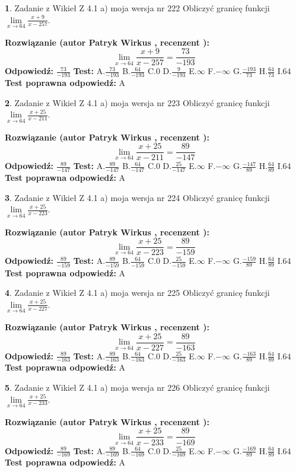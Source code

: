 \documentclass[12pt, a4paper]{article}
\theoremstyle{definition} %
\newtheorem{zad}{}
\newcommand{\zadStart}[1]{\begin{zad}#1\newline}
\newcommand{\zadStop}{\end{zad}}
\newcommand{\rozwStart}[2]{\noindent \textbf{Rozwiązanie (autor #1 , recenzent #2): }\newline}
\newcommand{\rozwStop}{\newline}
\newcommand{\odpStart}{\noindent \textbf{Odpowiedź:}\newline}
\newcommand{\odpStop}{\newline}
\newcommand{\testStart}{\noindent \textbf{Test:}\newline}
\newcommand{\testStop}{\newline}
\newcommand{\kluczStart}{\noindent \textbf{Test poprawna odpowiedź:}\newline}
\newcommand{\kluczStop}{\newline}
\begin{document}
\zadStart{Zadanie z Wikieł Z 4.1 a) moja wersja nr 222}
Obliczyć granicę funkcji $\lim\limits_{x\to64}\frac{x+9}{x-257}$.
\zadStop
\rozwStart{Patryk Wirkus}{}
$$\lim\limits_{x\to64}\frac{x+9}{x-257} = \frac{73}{-193}$$
\rozwStop
\odpStart
$\frac{73}{-193}$
\odpStop
\testStart
A.$\frac{73}{-193}$
B.$\frac{64}{-193}$
C.$0$
D.$\frac{9}{-193}$
E.$\infty$
F.$-\infty$
G.$\frac{-193}{73}$
H.$\frac{64}{73}$
I.$64$
\testStop
\kluczStart
A
\kluczStop



\zadStart{Zadanie z Wikieł Z 4.1 a) moja wersja nr 223}
Obliczyć granicę funkcji $\lim\limits_{x\to64}\frac{x+25}{x-211}$.
\zadStop
\rozwStart{Patryk Wirkus}{}
$$\lim\limits_{x\to64}\frac{x+25}{x-211} = \frac{89}{-147}$$
\rozwStop
\odpStart
$\frac{89}{-147}$
\odpStop
\testStart
A.$\frac{89}{-147}$
B.$\frac{64}{-147}$
C.$0$
D.$\frac{25}{-147}$
E.$\infty$
F.$-\infty$
G.$\frac{-147}{89}$
H.$\frac{64}{89}$
I.$64$
\testStop
\kluczStart
A
\kluczStop



\zadStart{Zadanie z Wikieł Z 4.1 a) moja wersja nr 224}
Obliczyć granicę funkcji $\lim\limits_{x\to64}\frac{x+25}{x-223}$.
\zadStop
\rozwStart{Patryk Wirkus}{}
$$\lim\limits_{x\to64}\frac{x+25}{x-223} = \frac{89}{-159}$$
\rozwStop
\odpStart
$\frac{89}{-159}$
\odpStop
\testStart
A.$\frac{89}{-159}$
B.$\frac{64}{-159}$
C.$0$
D.$\frac{25}{-159}$
E.$\infty$
F.$-\infty$
G.$\frac{-159}{89}$
H.$\frac{64}{89}$
I.$64$
\testStop
\kluczStart
A
\kluczStop



\zadStart{Zadanie z Wikieł Z 4.1 a) moja wersja nr 225}
Obliczyć granicę funkcji $\lim\limits_{x\to64}\frac{x+25}{x-227}$.
\zadStop
\rozwStart{Patryk Wirkus}{}
$$\lim\limits_{x\to64}\frac{x+25}{x-227} = \frac{89}{-163}$$
\rozwStop
\odpStart
$\frac{89}{-163}$
\odpStop
\testStart
A.$\frac{89}{-163}$
B.$\frac{64}{-163}$
C.$0$
D.$\frac{25}{-163}$
E.$\infty$
F.$-\infty$
G.$\frac{-163}{89}$
H.$\frac{64}{89}$
I.$64$
\testStop
\kluczStart
A
\kluczStop



\zadStart{Zadanie z Wikieł Z 4.1 a) moja wersja nr 226}
Obliczyć granicę funkcji $\lim\limits_{x\to64}\frac{x+25}{x-233}$.
\zadStop
\rozwStart{Patryk Wirkus}{}
$$\lim\limits_{x\to64}\frac{x+25}{x-233} = \frac{89}{-169}$$
\rozwStop
\odpStart
$\frac{89}{-169}$
\odpStop
\testStart
A.$\frac{89}{-169}$
B.$\frac{64}{-169}$
C.$0$
D.$\frac{25}{-169}$
E.$\infty$
F.$-\infty$
G.$\frac{-169}{89}$
H.$\frac{64}{89}$
I.$64$
\testStop
\kluczStart
A
\kluczStop
\end{document}
